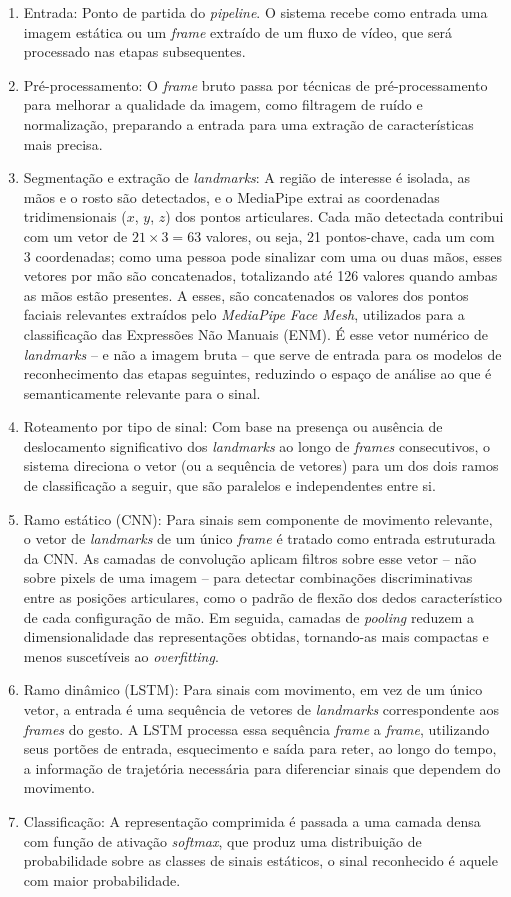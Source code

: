\documentclass[
    12pt,                %
    openright,           %
    oneside,             %
    a4paper,             %
    english,             %
    brazil               %
]{abntex2}
\begin{document}
\begin{enumerate}
	\item Entrada: Ponto de partida do \textit{pipeline}. O sistema recebe como entrada uma imagem estática ou um \textit{frame} extraído de um fluxo de vídeo, que será processado nas etapas subsequentes.
	\item Pré-processamento: O \textit{frame} bruto passa por técnicas de pré-processamento para melhorar a qualidade da imagem, como filtragem de ruído e normalização, preparando a entrada para uma extração de características mais precisa.
	\item Segmentação e extração de \textit{landmarks}: A região de interesse é isolada, as mãos e o rosto são detectados, e o MediaPipe extrai as coordenadas tridimensionais ($x$, $y$, $z$) dos pontos articulares. Cada mão detectada contribui com um vetor de $21 \times 3 = 63$ valores, ou seja, 21 pontos-chave, cada um com 3 coordenadas; como uma pessoa pode sinalizar com uma ou duas mãos, esses vetores por mão são concatenados, totalizando até 126 valores quando ambas as mãos estão presentes. A esses, são concatenados os valores dos pontos faciais relevantes extraídos pelo \textit{MediaPipe Face Mesh}, utilizados para a classificação das Expressões Não Manuais (ENM). É esse vetor numérico de \textit{landmarks} -- e não a imagem bruta -- que serve de entrada para os modelos de reconhecimento das etapas seguintes, reduzindo o espaço de análise ao que é semanticamente relevante para o sinal.
	\item Roteamento por tipo de sinal: Com base na presença ou ausência de deslocamento significativo dos \textit{landmarks} ao longo de \textit{frames} consecutivos, o sistema direciona o vetor (ou a sequência de vetores) para um dos dois ramos de classificação a seguir, que são paralelos e independentes entre si.
	\item Ramo estático (CNN): Para sinais sem componente de movimento relevante, o vetor de \textit{landmarks} de um único \textit{frame} é tratado como entrada estruturada da CNN. As camadas de convolução aplicam filtros sobre esse vetor -- não sobre pixels de uma imagem -- para detectar combinações discriminativas entre as posições articulares, como o padrão de flexão dos dedos característico de cada configuração de mão. Em seguida, camadas de \textit{pooling} reduzem a dimensionalidade das representações obtidas, tornando-as mais compactas e menos suscetíveis ao \textit{overfitting}.
	\item Ramo dinâmico (LSTM): Para sinais com movimento, em vez de um único vetor, a entrada é uma sequência de vetores de \textit{landmarks} correspondente aos \textit{frames} do gesto. A LSTM processa essa sequência \textit{frame} a \textit{frame}, utilizando seus portões de entrada, esquecimento e saída para reter, ao longo do tempo, a informação de trajetória necessária para diferenciar sinais que dependem do movimento.
    \item Classificação: A representação comprimida é passada a uma camada densa com função de ativação \textit{softmax}, que produz uma distribuição de probabilidade sobre as classes de sinais estáticos, o sinal reconhecido é aquele com maior probabilidade.
\end{enumerate}
\end{document}
